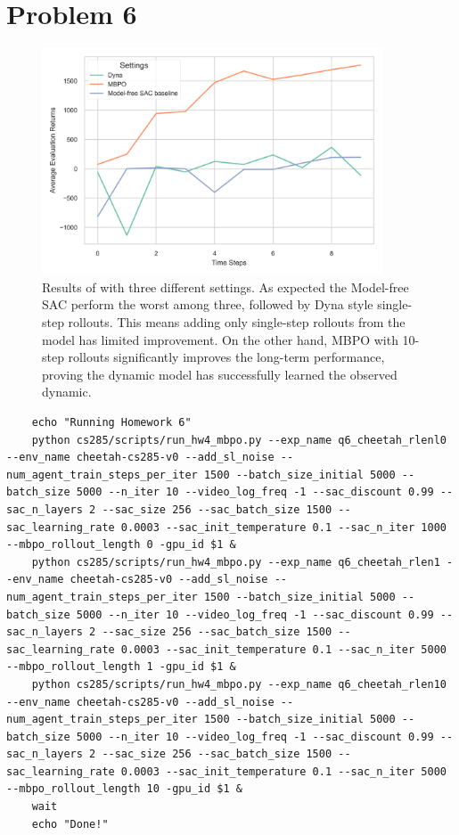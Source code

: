 \documentclass[10pt, letterpaper]{article}
\begin{document}
\pagebreak
\section*{Problem 6}

\begin{figure}[thbp]
    \centering
    \includegraphics[width=0.9\textwidth]{q6.png}
    \caption{Results of with three different settings. As expected the Model-free SAC perform the worst among three, followed by Dyna style single-step rollouts. This means adding only single-step rollouts from the model has limited improvement. On the other hand, MBPO with 10-step rollouts significantly improves the long-term performance, proving the dynamic model has successfully learned the observed dynamic.}
    \label{fig:6}
\end{figure}

\begin{lstlisting}
    echo "Running Homework 6"
    python cs285/scripts/run_hw4_mbpo.py --exp_name q6_cheetah_rlenl0 --env_name cheetah-cs285-v0 --add_sl_noise --num_agent_train_steps_per_iter 1500 --batch_size_initial 5000 --batch_size 5000 --n_iter 10 --video_log_freq -1 --sac_discount 0.99 --sac_n_layers 2 --sac_size 256 --sac_batch_size 1500 --sac_learning_rate 0.0003 --sac_init_temperature 0.1 --sac_n_iter 1000 --mbpo_rollout_length 0 -gpu_id $1 &
    python cs285/scripts/run_hw4_mbpo.py --exp_name q6_cheetah_rlen1 --env_name cheetah-cs285-v0 --add_sl_noise --num_agent_train_steps_per_iter 1500 --batch_size_initial 5000 --batch_size 5000 --n_iter 10 --video_log_freq -1 --sac_discount 0.99 --sac_n_layers 2 --sac_size 256 --sac_batch_size 1500 --sac_learning_rate 0.0003 --sac_init_temperature 0.1 --sac_n_iter 5000 --mbpo_rollout_length 1 -gpu_id $1 &
    python cs285/scripts/run_hw4_mbpo.py --exp_name q6_cheetah_rlen10 --env_name cheetah-cs285-v0 --add_sl_noise --num_agent_train_steps_per_iter 1500 --batch_size_initial 5000 --batch_size 5000 --n_iter 10 --video_log_freq -1 --sac_discount 0.99 --sac_n_layers 2 --sac_size 256 --sac_batch_size 1500 --sac_learning_rate 0.0003 --sac_init_temperature 0.1 --sac_n_iter 5000 --mbpo_rollout_length 10 -gpu_id $1 &
    wait
    echo "Done!"
\end{lstlisting}
\end{document}
